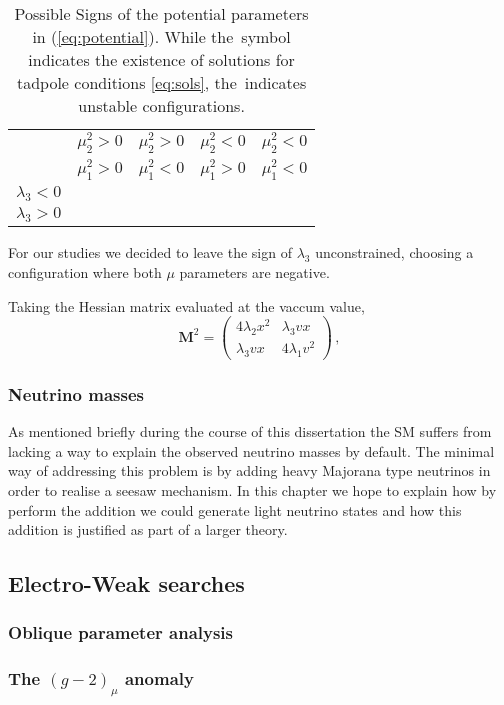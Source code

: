 \begin{table}[htb!]
	\begin{center}
		\begin{tabular}{|ccccc|}
			\hline  
			& $\mu_2^2 > 0$ & $\mu_2^2 > 0$ & $\mu_2^2 < 0$ & $\mu_2^2 < 0$  	\\
			& $\mu_1^2 > 0$ & $\mu_1^2 < 0$ & $\mu_1^2 > 0$ & $\mu_1^2 < 0$  	\\        
			\hline
			$\lambda_3 < 0 $     			    							& \xmark		& \checkmark	&	\checkmark & \checkmark	\\
			$\lambda_3 > 0$     			    							& \xmark		& \xmark	&	\xmark &  \checkmark \\
			\hline
		\end{tabular} 
		\caption{Possible Signs of the potential parameters in (\ref{eq:potential}). 
While the \checkmark\,symbol indicates the existence of solutions for tadpole conditions \eqref{eq:sols}, the \xmark\,indicates unstable configurations.}
		\label{tab:signs}  
	\end{center}
\end{table} 
For our studies we decided to leave the sign of $\lambda_3$ unconstrained, choosing a configuration where both $\mu$ parameters are negative. 

Taking the Hessian matrix evaluated at the vaccum value, 
\begin{equation}
\bm{M}^2 =
\begin{pmatrix}
4 \lambda_2 x^2 & \lambda_3 v x \\ 
\lambda_3 v x   & 4 \lambda_1 v^2 
\end{pmatrix}\,,
\label{eq:hess}
\end{equation}



\subsubsection{Neutrino masses}

As mentioned briefly during the course of this dissertation the SM suffers from lacking a way to explain the observed neutrino masses by default. The minimal way of addressing this problem is by adding heavy Majorana type neutrinos in order to realise a seesaw mechanism. In this chapter we hope to explain how by perform the addition we could generate light neutrino states and how this addition is justified as part of a larger theory. 

 
\subsection{Electro-Weak searches}

\subsubsection{ Oblique parameter analysis }

\subsubsection{ The $( g - 2 )_\mu $ anomaly }

